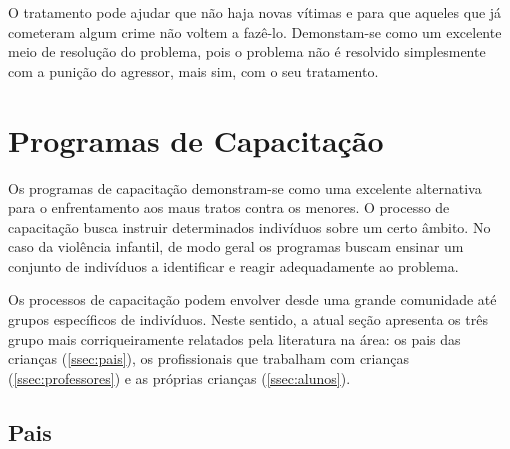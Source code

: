 O tratamento pode ajudar que não haja novas vítimas e para que aqueles que já cometeram algum crime não voltem a fazê-lo. Demonstam-se como um excelente meio de resolução do problema, pois o problema não é resolvido simplesmente com a punição do agressor, mais sim, com o seu tratamento. 



\section{Programas de Capacitação}\label{sec:programas}




Os programas de capacitação demonstram-se como uma excelente alternativa para o enfrentamento aos maus tratos contra os menores. O processo de capacitação busca instruir determinados indivíduos sobre um certo âmbito. No caso da violência infantil, de modo geral os programas buscam ensinar um conjunto de indivíduos a identificar e reagir adequadamente ao problema. 

Os processos de capacitação podem envolver desde uma grande comunidade até grupos específicos de indivíduos. Neste sentido, a atual seção apresenta os três grupo mais corriqueiramente relatados pela literatura na área: os pais das crianças (\autoref{ssec:pais}), os profissionais que trabalham com crianças (\autoref{ssec:professores}) e as próprias crianças (\autoref{ssec:alunos}).




\subsection{Pais}\label{ssec:pais}




